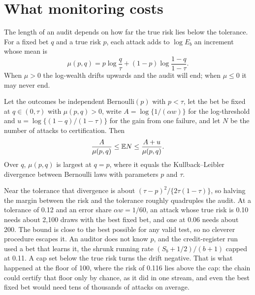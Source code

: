 \section{What monitoring costs}\label{c06:sec-cost}

The length of an audit depends on how far the true risk lies below the tolerance.
For a fixed bet $q$ and a true risk $p$, each attack adds to $\log E_b$ an
increment whose mean is
\begin{equation}\label{c06:eq-drift}
\mu(p,q) = p \log\frac{q}{\tau} + (1-p)\log\frac{1-q}{1-\tau} .
\end{equation}
When $\mu > 0$ the log-wealth drifts upwards and the audit will end; when $\mu \le
0$ it may never end.

\begin{proposition}\label{c06:prop-length}
Let the outcomes be independent Bernoulli$(p)$ with $p < \tau$, let the bet be fixed
at $q \in (0,\tau)$ with $\mu(p,q) > 0$, write $A = \log\{1/(\alpha w)\}$ for the
log-threshold and $u = \log\{(1-q)/(1-\tau)\}$ for the gain from one failure, and let
$N$ be the number of attacks to certification. Then
\[
\frac{A}{\mu(p,q)} \le \mathbb{E} N \le \frac{A + u}{\mu(p,q)} .
\]
Over $q$, $\mu(p,q)$ is largest at $q = p$, where it equals the Kullback--Leibler
divergence between Bernoulli laws with parameters $p$ and $\tau$.
\end{proposition}

Near the tolerance that divergence is about $(\tau - p)^2/\{2\tau(1-\tau)\}$, so
halving the margin between the risk and the tolerance roughly quadruples the
audit. At a tolerance of 0.12 and an error share $\alpha w = 1/60$, an attack whose
true risk is 0.10 needs about 2,100 draws with the best fixed bet, and one at 0.06
needs about 200.
The bound is close to the best possible for any valid test, so no cleverer
procedure escapes it. An auditor does not know $p$, and the credit-register run
used a bet that learns it, the shrunk running rate $(S_b + 1/2)/(b + 1)$ capped at
0.11. A cap set below the true risk turns the drift negative. That is what happened
at the floor of 100, where the risk of 0.116 lies above the cap: the chain could
certify that floor only by chance, as it did in one stream, and even the best fixed
bet would need tens of thousands of attacks on average.


